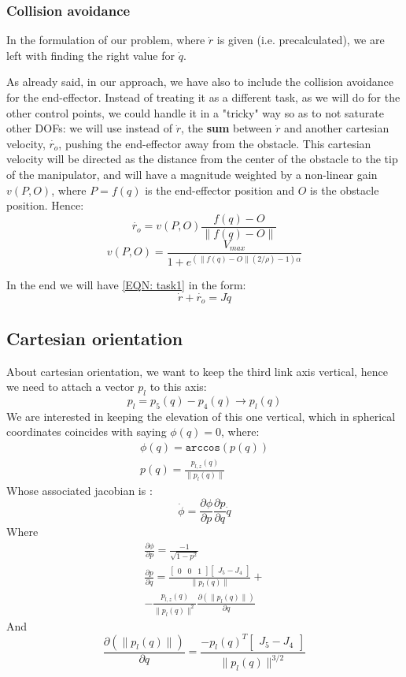 \documentclass[11pt,a4paper, twocolumn, twoside]{article}
\newcommand{\diff}[2]{\frac{\partial{#1}}{\partial{#2}}}
\newcommand{\norm}[1]{\parallel{#1}\parallel}
\begin{document}
\subsubsection{Collision avoidance}
In the formulation of our problem, where $\dot{r}$ is given (i.e. precalculated), we are left with finding the right value for $\dot{q}$.

As already said, in our approach, we have also to include the collision avoidance for the end-effector. Instead of treating it as a different task, as we will do for the other control points, we could handle it in a "tricky" way so as to not saturate other DOFs: we will use instead of $\dot{r}$, the \textbf{sum} between $\dot{r}$ and another cartesian velocity, $\dot{r_o}$, pushing the end-effector away from the obstacle. This cartesian velocity will be directed as the distance from the center of the obstacle to the tip of the manipulator, and will have a magnitude weighted by a non-linear gain $v(P,O)$, where $P = f(q)$ is the end-effector position and $O$ is the obstacle position.
Hence:
\begin{equation}\label{repulsive_dir}
\dot{r_o} = v(P,O)\frac{f(q) - O}{\lVert f(q) - O \rVert}
\end{equation}
\begin{equation}\label{repulsive_mag}
v(P,O) = \frac{V_{max}}{1+e^{(\lVert f(q) -O \rVert(2/\rho)-1)\alpha}}
\end{equation}

In the end we will have \eqref{EQN: task1} in the form: 
\[
\dot{r} + \dot{r_o} = J\dot{q}
\]
\subsection[Task 2]{Cartesian orientation}
About cartesian orientation, we want to keep the third link axis vertical, hence we need to attach a vector $p_l$ to this axis:
\[
p_l = p_5(q) - p_4(q) \rightarrow p_l(q)
\]
We are interested in keeping the elevation of this one vertical, which in spherical coordinates coincides with saying $\phi(q) = 0$, where:
\begin{gather*}
\phi(q) = \texttt{arccos}(p(q))\\
p(q) = \frac{p_{l,z}(q)}{\norm{p_l(q)}}
\end{gather*}
Whose associated jacobian is :
\begin{equation}
\dot{\phi} = \diff{\phi}{p}\diff{p}{q}\dot{q}
\end{equation}
Where
\begin{gather}
\diff{\phi}{p} = \frac{-1}{\sqrt{1-p^2}}\\
\diff{p}{q} = \frac{
\begin{bmatrix}
0&0&1
\end{bmatrix}
\begin{bmatrix}
J_5-J_4
\end{bmatrix}}{\norm{p_l(q)}} +\nonumber\\- 
\frac{p_{l,z}(q)}{\norm{p_l(q)}^2}\diff{(\norm{p_l(q)})}{q}
\end{gather}
And
\[
\diff{(\norm{p_l(q)})}{q}= \frac{-p_l(q)^T
\begin{bmatrix}
J_5-J_4
\end{bmatrix}}{\norm{p_l(q)}^{3/2}}
\]
\end{document}
